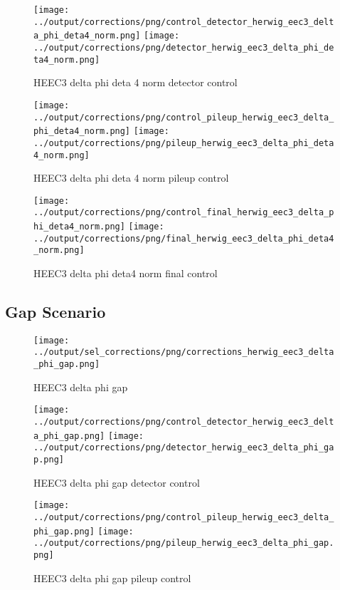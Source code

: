 \documentclass[11pt]{book}
\begin{document}
\begin{figure}[ht]
\centering
\texttt{[image: ../output/corrections/png/control\_detector\_herwig\_eec3\_delta\_phi\_deta4\_norm.png]}
\texttt{[image: ../output/corrections/png/detector\_herwig\_eec3\_delta\_phi\_deta4\_norm.png]}
\caption{HEEC3 delta phi deta 4 norm detector control}
\label{fig:HEEC3_delta_phi_deta4_norm_detector_control}
\end{figure}

\begin{figure}[ht]
\centering
\texttt{[image: ../output/corrections/png/control\_pileup\_herwig\_eec3\_delta\_phi\_deta4\_norm.png]}
\texttt{[image: ../output/corrections/png/pileup\_herwig\_eec3\_delta\_phi\_deta4\_norm.png]}
\caption{HEEC3 delta phi deta 4 norm pileup control}
\label{fig:HEEC3_delta_phi_deta4_norm_pileup_control}
\end{figure}


\begin{figure}[ht]
\centering
\texttt{[image: ../output/corrections/png/control\_final\_herwig\_eec3\_delta\_phi\_deta4\_norm.png]}
\texttt{[image: ../output/corrections/png/final\_herwig\_eec3\_delta\_phi\_deta4\_norm.png]}
\caption{HEEC3 delta phi deta4 norm final control}
\label{fig:HEEC3_delta_phi_deta4_norm_final_control}
\end{figure}


\clearpage
\subsection{Gap Scenario}


\begin{figure}[ht]
\centering
\texttt{[image: ../output/sel\_corrections/png/corrections\_herwig\_eec3\_delta\_phi\_gap.png]}
\caption{HEEC3 delta phi gap}
\label{fig:HEEC3_delta_phi_gap}
\end{figure}

\begin{figure}[ht]
\centering
\texttt{[image: ../output/corrections/png/control\_detector\_herwig\_eec3\_delta\_phi\_gap.png]}
\texttt{[image: ../output/corrections/png/detector\_herwig\_eec3\_delta\_phi\_gap.png]}
\caption{HEEC3 delta phi gap detector control}
\label{fig:HEEC3_delta_phi_gap_detector_control}
\end{figure}

\begin{figure}[ht]
\centering
\texttt{[image: ../output/corrections/png/control\_pileup\_herwig\_eec3\_delta\_phi\_gap.png]}
\texttt{[image: ../output/corrections/png/pileup\_herwig\_eec3\_delta\_phi\_gap.png]}
\caption{HEEC3 delta phi gap pileup control}
\label{fig:HEEC3_delta_phi_gap_pileup_control}
\end{figure}
\end{document}
